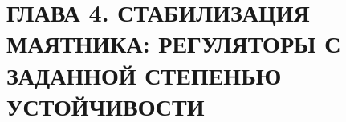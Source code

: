 \section{ГЛАВА 4. СТАБИЛИЗАЦИЯ МАЯТНИКА: РЕГУЛЯТОРЫ С ЗАДАННОЙ
СТЕПЕНЬЮ УСТОЙЧИВОСТИ}


\FloatBarrier
